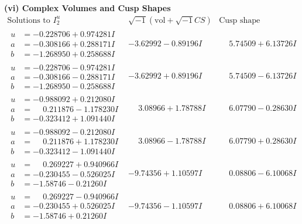 \documentclass[1p]{elsarticle_modified}
\theoremstyle{definition}
\newcommand{\I}{\sqrt{-1}}
\begin{document}
\newpage\flushleft \textbf{(vi) Complex Volumes and Cusp Shapes}
$$\begin{array}{c|c|c}  
\text{Solutions to }I^u_{2}& \I (\text{vol} + \sqrt{-1}CS) & \text{Cusp shape}\\
 \hline 
\begin{aligned}
u &= -0.228706 + 0.974281 I \\
a &= -0.308166 + 0.288171 I \\
b &= -1.268950 + 0.258688 I\end{aligned}
 & -3.62992 - 0.89196 I & \phantom{-}5.74509 + 6.13726 I \\ \hline\begin{aligned}
u &= -0.228706 - 0.974281 I \\
a &= -0.308166 - 0.288171 I \\
b &= -1.268950 - 0.258688 I\end{aligned}
 & -3.62992 + 0.89196 I & \phantom{-}5.74509 - 6.13726 I \\ \hline\begin{aligned}
u &= -0.988092 + 0.212080 I \\
a &= \phantom{-}0.211876 - 1.178230 I \\
b &= -0.323412 + 1.091440 I\end{aligned}
 & \phantom{-}3.08966 + 1.78788 I & \phantom{-}6.07790 - 0.28630 I \\ \hline\begin{aligned}
u &= -0.988092 - 0.212080 I \\
a &= \phantom{-}0.211876 + 1.178230 I \\
b &= -0.323412 - 1.091440 I\end{aligned}
 & \phantom{-}3.08966 - 1.78788 I & \phantom{-}6.07790 + 0.28630 I \\ \hline\begin{aligned}
u &= \phantom{-}0.269227 + 0.940966 I \\
a &= -0.230455 - 0.526025 I \\
b &= -1.58746 - 0.21260 I\end{aligned}
 & -9.74356 + 1.10597 I & \phantom{-}0.08806 - 6.10068 I \\ \hline\begin{aligned}
u &= \phantom{-}0.269227 - 0.940966 I \\
a &= -0.230455 + 0.526025 I \\
b &= -1.58746 + 0.21260 I\end{aligned}
 & -9.74356 - 1.10597 I & \phantom{-}0.08806 + 6.10068 I \\ \hline\begin{aligned}

\end{aligned}
\end{array}$$
\end{document}
